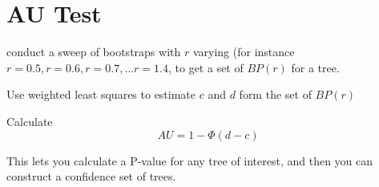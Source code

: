 \documentclass[landscape]{foils}
\begin{document}
\myNewSlide
\section*{AU Test}
		\begin{compactenum}
			\item conduct a sweep of bootstraps with $r$ varying (for instance $r = 0.5,  r=0.6, r=0.7, \ldots r=1.4$, to get a set of $BP(r)$ for a tree. 
			\item Use weighted least squares to estimate $c$ and $d$ form the set of $BP(r)$
			\item Calculate \[AU = 1-\Phi(d-c)\]
		\end{compactenum}
This lets you calculate a P-value for any tree of interest, and then you can construct a confidence set of trees.


\myNewSlide

\end{document}

